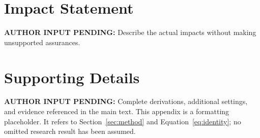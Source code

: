 \documentclass{article}\usepackage{microtype,graphicx,booktabs,hyperref}
\newcommand{\AuthorPending}[1]{\textbf{AUTHOR INPUT PENDING:} #1}
\begin{document}
\printAffiliationsAndNotice{}
\begin{abstract}
AUTHOR INPUT PENDING: write a single-paragraph abstract from the actual research problem,
method or theoretical contribution, key evidence, and scope. This template contains
no research findings and cannot be submitted as a manuscript.
\end{abstract}

\section*{Impact Statement}\AuthorPending{Describe the actual impacts without making unsupported assurances.}

\clearpage
\appendix
\section{Supporting Details}
\label{app:supporting}
\AuthorPending{Complete derivations, additional settings, and evidence referenced in the main text.}
This appendix is a formatting placeholder. It refers to Section~\ref{sec:method} and
Equation~\ref{eq:identity}; no omitted research result has been assumed.
\end{document}
